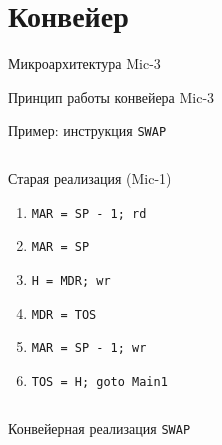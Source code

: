 \section{Конвейер}

\begin{frame}[plain]{Микроархитектура Mic-3}
\end{frame}

\begin{frame}[plain]{Принцип работы конвейера Mic-3}
\end{frame}

\begin{frame}{Пример: инструкция \texttt{SWAP}}
\pause
\begin{columns}
    \column{6cm}
\begin{block}{Старая реализация (Mic-1)}
\pause
    \begin{enumerate}
        \item \texttt{MAR = SP - 1; rd}
        \item \texttt{MAR = SP}
        \item \texttt{H = MDR; wr}
        \item \texttt{MDR = TOS}
        \item \texttt{MAR = SP - 1; wr}
        \item \texttt{TOS = H; goto Main1}
    \end{enumerate}
\end{block}
    \column{0cm}
\end{columns}
\end{frame}

\begin{frame}{Конвейерная реализация \texttt{SWAP}}
\end{frame}

